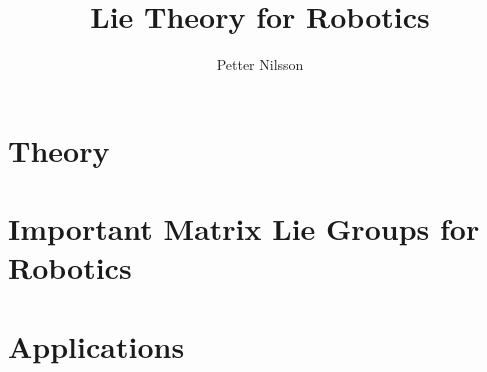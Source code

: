 \documentclass{scrbook}
\title{Lie Theory for Robotics}
\author{Petter Nilsson}
\begin{document}
\frontmatter

\maketitle

\tableofcontents

\mainmatter



\part{Theory}













\part{Important Matrix Lie Groups for Robotics}







\part{Applications}



















\backmatter

\printbibliography

% 

\end{document}
